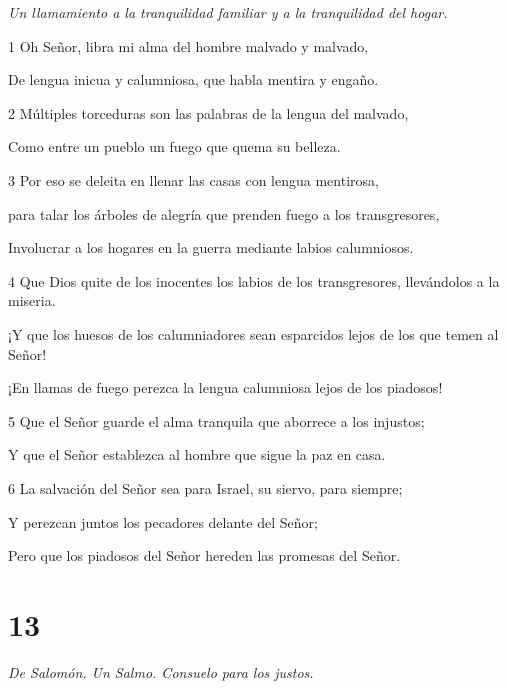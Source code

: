\par \textit{Un llamamiento a la tranquilidad familiar y a la tranquilidad del hogar.}

\par 1 Oh Señor, libra mi alma del hombre malvado y malvado,
\par     De lengua inicua y calumniosa, que habla mentira y engaño.
\par 2 Múltiples torceduras son las palabras de la lengua del malvado,
\par     Como entre un pueblo un fuego que quema su belleza.
\par 3 Por eso se deleita en llenar las casas con lengua mentirosa,
\par     para talar los árboles de alegría que prenden fuego a los transgresores,
\par     Involucrar a los hogares en la guerra mediante labios calumniosos.
\par   
\par 4 Que Dios quite de los inocentes los labios de los transgresores, llevándolos a la miseria.
\par     ¡Y que los huesos de los calumniadores sean esparcidos lejos de los que temen al Señor!
\par     ¡En llamas de fuego perezca la lengua calumniosa lejos de los piadosos!
\par 5 Que el Señor guarde el alma tranquila que aborrece a los injustos;
\par     Y que el Señor establezca al hombre que sigue la paz en casa.
\par 6 La salvación del Señor sea para Israel, su siervo, para siempre;
\par     Y perezcan juntos los pecadores delante del Señor;
\par     Pero que los piadosos del Señor hereden las promesas del Señor.

\chapter{13}

\par \textit{De Salomón. Un Salmo. Consuelo para los justos.}

